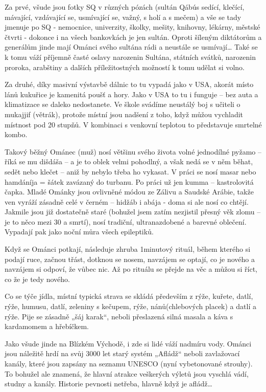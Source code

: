 Za prvé, všude jsou fotky SQ v různých pózách (sultán Qábús sedící, klečící, mávající, vzdávající se, usmívající se, važný, s holí a s mečem) a vše se tady jmenuje po SQ  - nemocnice, univerzity, školky, mešity, knihovny, lékárny, městské čtvrti - dokonce i na všech bankovkách je jen sultán. Oproti šíleným diktátorům a generálům jinde mají Ománci svého sultána rádi a neustále se usmívají… Také se k tomu váží příjemně časté oslavy narozenin Sultána, státních svátků, narozenin proroka, arabštiny a dalších příležitostných možností k tomu udělat si volno.

Za druhé, díky masivní výstavbě dálnic to tu vypadá jako v USA, akorát místo lánů kukuřice je kamenitá poušť a hory. Jako v USA to tu i funguje – bez auta a klimatizace se daleko nedostanete. Ve škole svádíme neustálý boj s učiteli o mukajjif (větrák), protože místní jsou nadšení z toho, když můžou vychladit místnost pod 20 stupňů. V kombinaci s venkovní teplotou to představuje smrtelné kombo.

Takový běžný Ománec (muž) nosí většinu svého života volné jednodílné pyžamo – říká se mu dišdáša – a je to oblek velmi pohodlný, a však nedá se v něm běhat, sedět nebo klečet – aniž by nebylo třeba ho vykasat. V práci se nosí masar nebo hamdáníja = šátek zavázaný do turbanu. Po práci už jen kumma – kastrolovitá čapka. Mladé Ománky jsou ovlivněné módou ze Zálivu a Saudské Arábie, takže ven vyráží zásadně celé v černém – hidžáb i abája - doma si ale nosí co chtějí. Jakmile jsou již dostatečně staré (bohužel jsem zatím nezjistil přesný věk zlomu – je to něco mezi 30 a smrtí), nosí tradiční, ultranazdobené a barevné oblečení. Vypadají pak jako noční můra všech epileptiků.

Když se Ománci potkají, následuje zhruba 1minutový rituál, během kterého si podají ruce, začnou třást, dotknou se nosem, navzájem se optají, co je nového a navzájem si odpoví, že vůbec nic. Až po rituálu se přejde na věc a můžou si říct, co že je tedy nového. 

Co se týče jídla, místní typická strava se skládá především z rýže, kuřete, datlí, rýže, humusu, datlí, zeleniny s kečupem, rýže, nánů(chlebových placek) a datlí a rýže. Pije se zásadně „šáj karak“, neboli přeslazená silná masala a káva s kardamomem a hřebíčkem. 

Jako všude jinde na Blízkém Východě, i zde si lidé váží nadmíru vody. Ománci jsou náležitě hrdí na svůj 3000 let starý systém „Afládž“ neboli zavlažovací kanály, které jsou zapsány na seznamu UNESCO (nyní vybetonované strouhy). To bohužel ale znamená, že hlavní atrakce veškerých výletů jsou vyschlá vádí, studny a kanály. Historie pevnosti netřeba, hlavně když je afládž…

